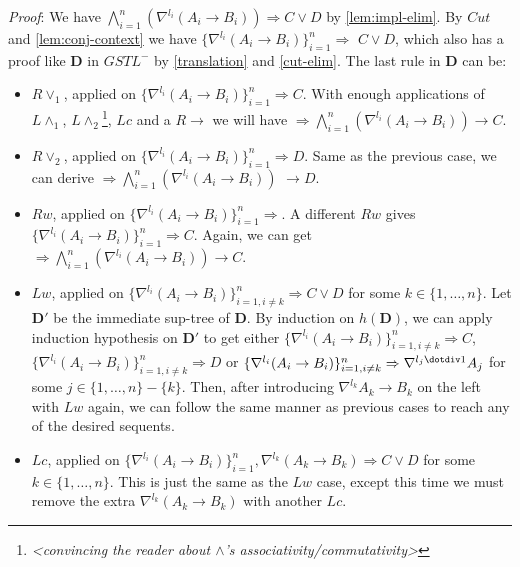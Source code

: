 \textit{Proof}:
We have $\bigwedge_{i=1}^n (\nabla^{l_i} (A_i \rightarrow B_i)) \Rightarrow C \lor D$ by \ref{lem:impl-elim}. By $Cut$ and \ref{lem:conj-context} we have $\{ \nabla^{l_i} (A_i \rightarrow B_i) \}_{i=1}^n \Rightarrow$ $C \lor D$, which also has a proof like $\mathbf{D}$ in $GSTL^-$ by \ref{translation} and \ref{cut-elim}. The last rule in $\mathbf{D}$ can be:
\begin{itemize}[label=-]
	\item $R\lor_1$, applied on $\{ \nabla^{l_i} (A_i \rightarrow B_i) \}_{i=1}^n \Rightarrow C$. With enough applications of $L\land_1$, $L\land_2$\footnote{{\color{red} \textit{<convincing the reader about $\land$'s associativity/commutativity>} }}, $Lc$ and a $R\rightarrow$ we will have $\Rightarrow \bigwedge_{i=1}^n (\nabla^{l_i} (A_i \rightarrow B_i)) \rightarrow C$.
	
	\item $R\lor_2$, applied on $\{ \nabla^{l_i} (A_i \rightarrow B_i) \}_{i=1}^n \Rightarrow D$. Same as the previous case, we can derive $\Rightarrow \bigwedge_{i=1}^n (\nabla^{l_i} (A_i \rightarrow B_i)) $ $\rightarrow D$.
	
	\item $Rw$, applied on $\{ \nabla^{l_i} (A_i \rightarrow B_i) \}_{i=1}^n \Rightarrow$. A different $Rw$ gives $\{ \nabla^{l_i} (A_i \rightarrow B_i) \}_{i=1}^n \Rightarrow C$. Again, we can get $\Rightarrow \bigwedge_{i=1}^n (\nabla^{l_i} (A_i \rightarrow B_i)) \rightarrow C$.
	
	\item $Lw$, applied on $\{ \nabla^{l_i} (A_i \rightarrow B_i) \}_{i=1,i \neq k}^n \Rightarrow C \lor D$ for some $k \in \{ 1 , \dots , n \}$. Let $\mathbf{D}'$ be the immediate sup-tree of $\mathbf{D}$. By induction on $h(\mathbf{D})$, we can apply induction hypothesis on $\mathbf{D}'$ to get either $\{ \nabla^{l_i} (A_i \rightarrow B_i) \}_{i=1,i \neq k}^n \Rightarrow C$, $\{ \nabla^{l_i} (A_i \rightarrow B_i) \}_{i=1,i \neq k}^n \Rightarrow D$ or $\{ \nabla^{l_i} (A_i \rightarrow B_i) \}_{i=1,i \neq k}^n \Rightarrow \nabla^{l_j \dotdiv 1} A_j$ for some $j \in \{ 1 , \dots , n \} - \{k\}$. Then, after introducing $\nabla^{l_k} A_k \rightarrow B_k$ on the left with $Lw$ again, we can follow the same manner as previous cases to reach any of the desired sequents.
	
	\item $Lc$, applied on $\{ \nabla^{l_i} (A_i \rightarrow B_i) \}_{i=1}^n , \nabla^{l_k} (A_k \rightarrow B_k) \Rightarrow C \lor D$ for some $k \in \{ 1 , \dots , n \}$. This is just the same as the $Lw$ case, except this time we must remove the extra $\nabla^{l_k} (A_k \rightarrow B_k)$ with another $Lc$.
	

\end{itemize}
